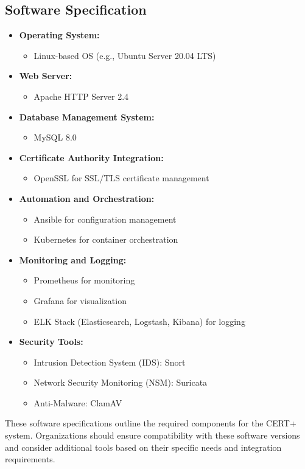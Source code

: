 \documentclass[10pt]{report}
\begin{document}
\subsection{Software Specification}
\begin{itemize}[label=--]
  \item \textbf{ Operating System:}
  \begin{itemize}
      \item Linux-based OS (e.g., Ubuntu Server 20.04 LTS)
  \end{itemize}
  
  \item \textbf{Web Server:}
  \begin{itemize}
      \item Apache HTTP Server 2.4
  \end{itemize}
  
  \item \textbf{ Database Management System:}
  \begin{itemize}
      \item MySQL 8.0
  \end{itemize}
  
  \item \textbf{ Certificate Authority Integration:}
  \begin{itemize}
      \item OpenSSL for SSL/TLS certificate management
  \end{itemize}
  
  \item \textbf{ Automation and Orchestration:}
  \begin{itemize}
      \item Ansible for configuration management
      \item Kubernetes for container orchestration
  \end{itemize}
  
  \item \textbf{ Monitoring and Logging:}
  \begin{itemize}
      \item Prometheus for monitoring
      \item Grafana for visualization
      \item ELK Stack (Elasticsearch, Logstash, Kibana) for logging
  \end{itemize}
  
  \item \textbf{ Security Tools:}
  \begin{itemize}
      \item Intrusion Detection System (IDS): Snort
      \item Network Security Monitoring (NSM): Suricata
      \item Anti-Malware: ClamAV
  \end{itemize}
\end{itemize}
 These software specifications outline the required components for the CERT+ system. Organizations should ensure compatibility with these software versions and consider additional tools based on their specific needs and integration requirements.
\end{document}
